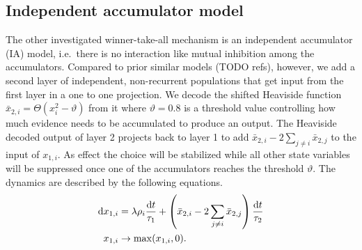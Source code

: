 \documentclass[10pt,letterpaper]{article}
\begin{document}
\subsection{Independent accumulator model}
The other investigated winner-take-all mechanism is an independent accumulator 
(IA) model, i.e.~there is no interaction like mutual inhibition among the 
accumulators. Compared to prior similar models (TODO refs), however, we add 
a second layer of independent, non-recurrent populations that get input from the 
first layer in a one to one projection. We decode the shifted Heaviside function 
$\bar{x}_{2,i} = \Theta(x^2_i - \vartheta)$ from it where $\vartheta = 0.8$ is 
a threshold value controlling how much evidence needs to be accumulated to 
produce an output.
The Heaviside decoded output of layer 2 projects back to layer 1 to add 
$\bar{x}_{2,i} - 2\sum_{j \neq i} \bar{x}_{2,j}$ to the input of $x_{1,i}$. As 
effect the choice will be stabilized while all other state variables will be 
suppressed once one of the accumulators reaches the threshold $\vartheta$.  The 
dynamics are described by the following equations.
\begin{equation}
    \begin{split}
        \dif x_{1,i} &= \lambda \rho_i \frac{\dif t}{\tau_1} + \left( 
            \bar{x}_{2,i} - 2\sum_{j \neq i} \bar{x}_{2,j} \right) \frac{\dif 
            t}{\tau_2} \\
    x_{1,i} &\rightarrow \max(x_{1,i}, 0) \text{.}
    \end{split}
\end{equation}
\end{document}
